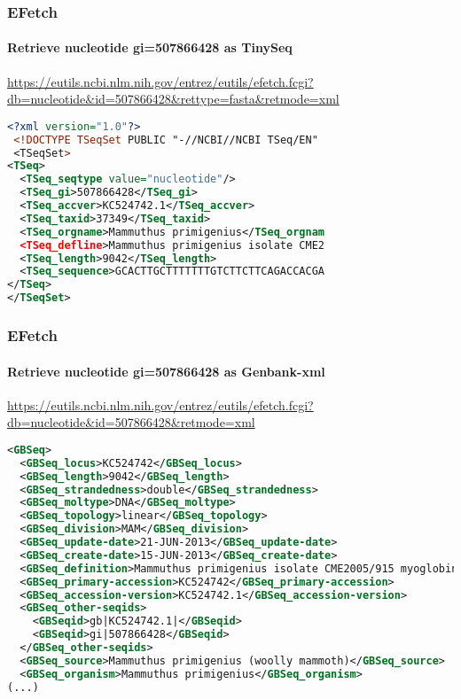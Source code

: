 \documentclass{beamer}
\begin{document}
\begin{frame}[fragile]
\frametitle{EFetch}
\framesubtitle{Retrieve nucleotide gi=507866428 as TinySeq}
\url{https://eutils.ncbi.nlm.nih.gov/entrez/eutils/efetch.fcgi?db=nucleotide&id=507866428&rettype=fasta&retmode=xml}
\begin{lstlisting}[language=xml,basicstyle=\tiny,breaklines=false]
<?xml version="1.0"?>
 <!DOCTYPE TSeqSet PUBLIC "-//NCBI//NCBI TSeq/EN" 
 <TSeqSet>
<TSeq>
  <TSeq_seqtype value="nucleotide"/>
  <TSeq_gi>507866428</TSeq_gi>
  <TSeq_accver>KC524742.1</TSeq_accver>
  <TSeq_taxid>37349</TSeq_taxid>
  <TSeq_orgname>Mammuthus primigenius</TSeq_orgnam
  <TSeq_defline>Mammuthus primigenius isolate CME2
  <TSeq_length>9042</TSeq_length>
  <TSeq_sequence>GCACTTGCTTTTTTTGTCTTCTTCAGACCACGA
</TSeq>
</TSeqSet>
\end{lstlisting}
\end{frame}


\begin{frame}[fragile]
\frametitle{EFetch}
\framesubtitle{Retrieve nucleotide gi=507866428 as Genbank-xml}
\url{https://eutils.ncbi.nlm.nih.gov/entrez/eutils/efetch.fcgi?db=nucleotide&id=507866428&retmode=xml}
\begin{lstlisting}[language=xml,basicstyle=\tiny,breaklines=false]
<GBSeq>
  <GBSeq_locus>KC524742</GBSeq_locus>
  <GBSeq_length>9042</GBSeq_length>
  <GBSeq_strandedness>double</GBSeq_strandedness>
  <GBSeq_moltype>DNA</GBSeq_moltype>
  <GBSeq_topology>linear</GBSeq_topology>
  <GBSeq_division>MAM</GBSeq_division>
  <GBSeq_update-date>21-JUN-2013</GBSeq_update-date>
  <GBSeq_create-date>15-JUN-2013</GBSeq_create-date>
  <GBSeq_definition>Mammuthus primigenius isolate CME2005/915 myoglobin (Mb) gene, partial cds</GBSeq_definition>
  <GBSeq_primary-accession>KC524742</GBSeq_primary-accession>
  <GBSeq_accession-version>KC524742.1</GBSeq_accession-version>
  <GBSeq_other-seqids>
    <GBSeqid>gb|KC524742.1|</GBSeqid>
    <GBSeqid>gi|507866428</GBSeqid>
  </GBSeq_other-seqids>
  <GBSeq_source>Mammuthus primigenius (woolly mammoth)</GBSeq_source>
  <GBSeq_organism>Mammuthus primigenius</GBSeq_organism>
(...)
\end{lstlisting}
\end{frame}
\end{document}
